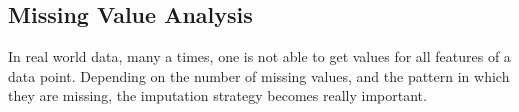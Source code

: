 \documentclass[12pt]{report}
\begin{document}
\begin{figure}[H]
  \centering
  \hfill
  \vfill
  \hfill
  \vfill
  \hfill
\end{figure}

\subsection{Missing Value Analysis}
In real world data, many a times, one is not able to get values for all features of a data point. Depending on the number of missing values, and the pattern in which they are missing, the imputation strategy becomes really important.\\
\end{document}

